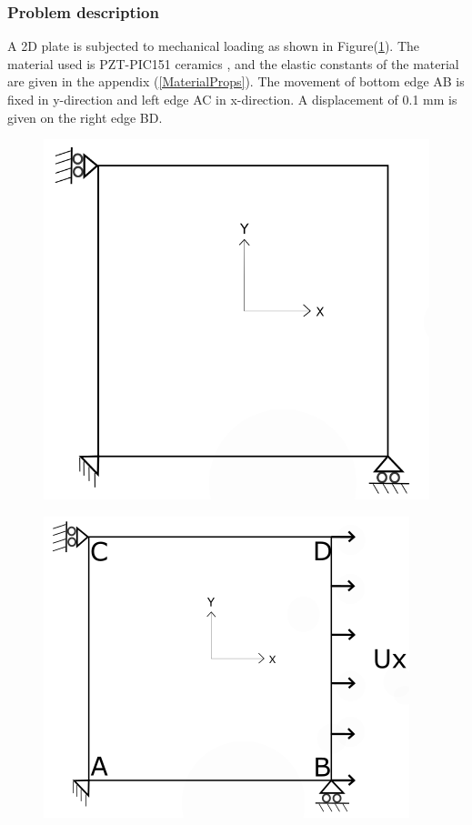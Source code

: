 \documentclass[11pt]{article}
\begin{document}
\subsubsection{Problem description} \label{2DPWLELPD}
A 2D plate is subjected to mechanical loading as shown in Figure(\ref{XYLoading}). The material used is PZT-PIC151 ceramics \cite{kozinov2018simulation}, and the elastic constants of the material are given in the appendix (\ref{MaterialProps}).
The movement of bottom edge AB is fixed in y-direction and left edge AC in x-direction. A displacement of 0.1 mm is given on the right edge BD.
\begin{figure}[H]
	\centering
	\begin{minipage}{.5\textwidth}
		\centering
		\includegraphics[width=0.8\linewidth]{2DPlate.png}
		\label{2Dplate}
	\end{minipage}%
	\begin{minipage}{.5\textwidth}
		\centering
		\includegraphics[width=0.9\linewidth]{XYLoading.png}
		\label{XYLoading}
	\end{minipage}
\end{figure}
\end{document}
